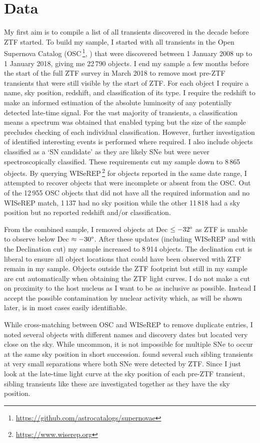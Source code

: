 \documentclass[a4paper,oneside,12pt, class=Latex/Classes/PhDthesisPSnPDF, crop=false]{standalone}
\begin{document}
\section{Data}
\label{Pre-ZTF_data}
My first aim is to compile a list of all transients discovered in the decade before ZTF started. To build my sample, I started with all transients in the Open Supernova Catalog (OSC\,\footnote{\url{https://github.com/astrocatalogs/supernovae}}, \citealt{Open_SN_cat}) that were discovered between 1 January 2008 up to 1 January 2018, giving me 22\,790 objects. I end my sample a few months before the start of the full ZTF survey in March 2018 to remove most pre-ZTF transients that were still visible by the start of ZTF. For each object I require a name, sky position, redshift, and classification of its type. I require the redshift to make an informed estimation of the absolute luminosity of any potentially detected late-time signal. For the vast majority of transients, a classification means a spectrum was obtained that enabled typing but the size of the sample precludes checking of each individual classification. However, further investigation of identified interesting events is performed where required. I also include objects classified as a `SN candidate' as they are likely SNe but were never spectroscopically classified. These requirements cut my sample down to 8\,865 objects. By querying WISeREP\,\footnote{\url{https://www.wiserep.org}} \citep{wiserep} for objects reported in the same date range, I attempted to recover objects that were incomplete or absent from the OSC. Out of the 12\,955 OSC objects that did not have all the required information and no WISeREP match, 1\,137 had no sky position while the other 11\,818 had a sky position but no reported redshift and/or classification.

From the combined sample, I removed objects at Dec $\leq -32\degree$ as ZTF is unable to observe below Dec $\approx -30\degree$. After these updates (including WISeREP and with the Declination cut) my sample increased to 8\,914 objects. The declination cut is liberal to ensure all object locations that could have been observed with ZTF remain in my sample. Objects outside the ZTF footprint but still in my sample are cut automatically when obtaining the ZTF light curves. I do not make a cut on proximity to the host nucleus as I want to be as inclusive as possible. Instead I accept the possible contamination by nuclear activity which, as will be shown later, is in most cases easily identifiable.

While cross-matching between OSC and WISeREP to remove duplicate entries, I noted several objects with different names and discovery dates but located very close on the sky. While uncommon, it is not impossible for multiple SNe to occur at the same sky position in short succession. \citet{Terwel_2024_paper1} found several such sibling transients at very small separations where both SNe were detected by ZTF. Since I just look at the late-time light curve at the sky position of each pre-ZTF transient, sibling transients like these are investigated together as they have the sky position.
\end{document}
